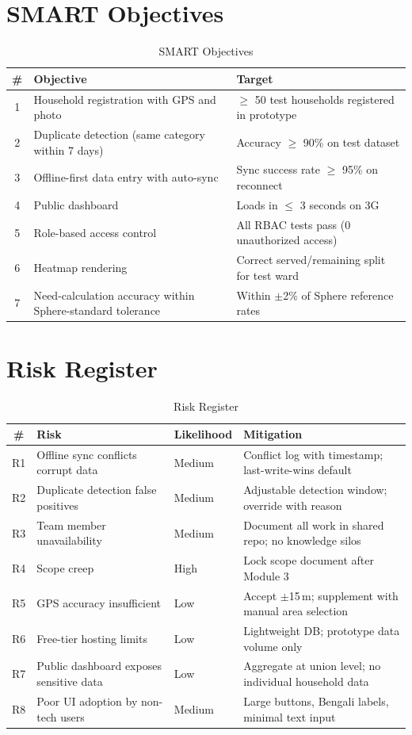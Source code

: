 \vspace{-2pt}
\section{SMART Objectives}
\begin{table}[H]
\centering
\vspace{-8pt}
\caption{SMART Objectives}
\label{tab:smart-objectives}
\begin{tabularx}{\textwidth}{@{}clX@{}}
\toprule
\# & Objective & Target \\
\midrule
1 & Household registration with GPS and photo & $\ge$ 50 test households registered in prototype \\
2 & Duplicate detection (same category within 7 days) & Accuracy $\ge$ 90\% on test dataset \\
3 & Offline-first data entry with auto-sync & Sync success rate $\ge$ 95\% on reconnect \\
4 & Public dashboard & Loads in $\le$ 3 seconds on 3G \\
5 & Role-based access control & All RBAC tests pass (0 unauthorized access) \\
6 & Heatmap rendering & Correct served/remaining split for test ward \\
7 & Need-calculation accuracy within Sphere-standard tolerance & Within $\pm$2\% of Sphere reference rates \\
\bottomrule
\end{tabularx}
\end{table}
\vspace{-15pt}
\section{Risk Register}
\begin{table}[H]
\centering
\caption{Risk Register}
\label{tab:risk-register}
\begin{tabularx}{\textwidth}{@{}cllX@{}}
\toprule
\# & Risk & Likelihood & Mitigation \\
\midrule
R1 & Offline sync conflicts corrupt data & Medium & Conflict log with timestamp; last-write-wins default \\
R2 & Duplicate detection false positives & Medium & Adjustable detection window; override with reason \\
R3 & Team member unavailability & Medium & Document all work in shared repo; no knowledge silos \\
R4 & Scope creep & High & Lock scope document after Module 3 \\
R5 & GPS accuracy insufficient & Low & Accept $\pm$15\,m; supplement with manual area selection \\
R6 & Free-tier hosting limits & Low & Lightweight DB; prototype data volume only \\
R7 & Public dashboard exposes sensitive data & Low & Aggregate at union level; no individual household data \\
R8 & Poor UI adoption by non-tech users & Medium & Large buttons, Bengali labels, minimal text input \\
\bottomrule
\end{tabularx}
\end{table}

